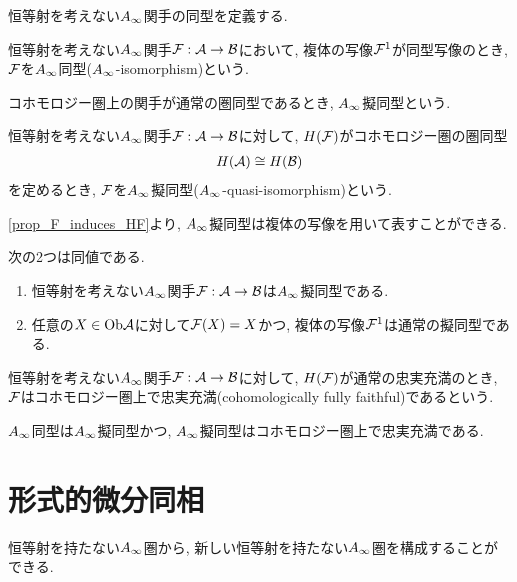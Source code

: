 \documentclass[uplatex, a4paper, 14Q, dvipdfmx]{jsarticle}
\begin{document}
恒等射を考えない$\Ainf$関手の同型を定義する. 

\begin{definition}[$\Ainf$同型]
  恒等射を考えない$\Ainf$関手$\mathcal{F} : \mathcal{A} \to \mathcal{B}$において, 複体の写像$\mathcal{F}^1$が同型写像のとき, $\mathcal{F}$を$\Ainf$同型($\Ainf$-isomorphism)という.
\end{definition}

コホモロジー圏上の関手が通常の圏同型であるとき, $\Ainf$擬同型という. 

\begin{definition}
  恒等射を考えない$\Ainf$関手$\mathcal{F} : \mathcal{A} \to \mathcal{B}$に対して, $H(\mathcal{F})$がコホモロジー圏の圏同型
  \begin{align*}
    H(\mathcal{A}) \cong H(\mathcal{B})
  \end{align*}
  を定めるとき, $\mathcal{F}$を$\Ainf$擬同型($\Ainf$-quasi-isomorphism)という. 
\end{definition}

\cref{prop_F_induces_HF}より, $\Ainf$擬同型は複体の写像を用いて表すことができる. 

\begin{lemma}
  次の2つは同値である. 
  \begin{enumerate}
    \item 恒等射を考えない$\Ainf$関手$\mathcal{F} : \mathcal{A} \to \mathcal{B}$は$\Ainf$擬同型である. 
    \item 任意の$X \in \mathrm{Ob}\mathcal{A}$に対して$\mathcal{F}(X) = X$かつ, 複体の写像$\mathcal{F}^1$は通常の擬同型である. 
  \end{enumerate}
\end{lemma}

\begin{definition}[コホモロジー圏上で忠実充満]
  恒等射を考えない$\Ainf$関手$\mathcal{F} : \mathcal{A} \to \mathcal{B}$に対して, $H(\mathcal{F})$が通常の忠実充満のとき, $\mathcal{F}$はコホモロジー圏上で忠実充満(cohomologically fully faithful)であるという. 
\end{definition}

\begin{example}
  $\Ainf$同型は$\Ainf$擬同型かつ, $\Ainf$擬同型はコホモロジー圏上で忠実充満である. 
\end{example}

\section{形式的微分同相} \label{section_formal_diffeomorphism}

恒等射を持たない$\Ainf$圏から, 新しい恒等射を持たない$\Ainf$圏を構成することができる.
\end{document}
